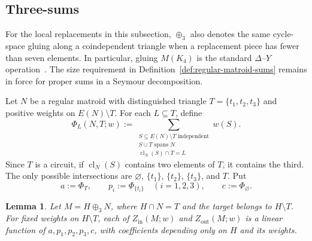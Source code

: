 \documentclass[11pt]{article}
\numberwithin{equation}{section}
\newtheorem{lemma}[definition]{Lemma}
\theoremstyle{remark}
\newcommand{\cl}{\operatorname{cl}}
\begin{document}
\subsection{Three-sums}
\label{subsec:seymour-three-sum}

For the local replacements in this subsection, $\oplus_3$ also denotes the
same cycle-space gluing along a coindependent triangle when a replacement
piece has fewer than seven elements. In particular, gluing $M(K_4)$ is the
standard $\Delta$--$Y$ operation~\cite[Sec.~2]{BercziMatravolgyiSchwarcz2023}.
The size requirement in Definition~\ref{def:regular-matroid-sums} remains in
force for proper sums in a Seymour decomposition.

Let $N$ be a regular matroid with distinguished triangle
$T=\{t_1,t_2,t_3\}$ and positive weights on $E(N)\setminus T$. For each
$L\subseteq T$, define
\begin{equation}
    \Phi_L(N,T;w)
    :=
    \sum_{\substack{S\subseteq E(N)\setminus T\text{ independent}\\
                     S\cup T\text{ spans }N\\
                     \cl_N(S)\cap T=L}}
        w(S).
    \label{eq:seymour-three-sum-phi}
\end{equation}
Since $T$ is a circuit, if $\cl_N(S)$ contains two elements of $T$, it
contains the third. The only possible intersections are
$\varnothing$, $\{t_1\}$, $\{t_2\}$, $\{t_3\}$, and $T$. Put
\begin{equation}
    a:=\Phi_T,
    \qquad
    p_i:=\Phi_{\{t_i\}}\quad(i=1,2,3),
    \qquad
    c:=\Phi_\varnothing.
    \label{eq:seymour-three-sum-five}
\end{equation}

\begin{lemma}
\label{lem:seymour-three-sum-five}
Let $M=H\oplus_3N$, where $H\cap N=T$ and the target belongs to $H\setminus T$.
For fixed weights on $H\setminus T$, each of
$Z_{\mathrm{in}}(M;w)$ and $Z_{\mathrm{out}}(M;w)$ is a linear function of
$a,p_1,p_2,p_3,c$, with coefficients depending only on $H$ and its weights.
\end{lemma}
\end{document}
